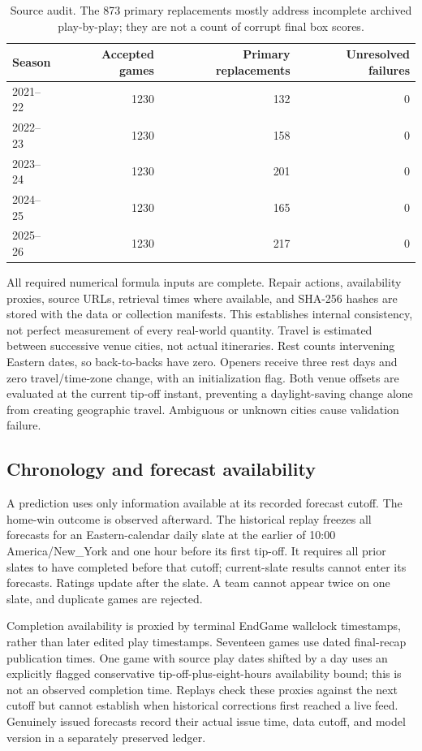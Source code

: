 \documentclass[11pt]{article}
\begin{document}
\begin{table}[ht]
\centering\small
\begin{tabular}{lrrr}
\toprule
Season & Accepted games & Primary replacements & Unresolved failures\\
\midrule
2021--22 & 1230 & 132 & 0\\
2022--23 & 1230 & 158 & 0\\
2023--24 & 1230 & 201 & 0\\
2024--25 & 1230 & 165 & 0\\
2025--26 & 1230 & 217 & 0\\
\bottomrule
\end{tabular}
\caption{Source audit. The 873 primary replacements mostly address incomplete
archived play-by-play; they are not a count of corrupt final box scores.}
\end{table}

All required numerical formula inputs are complete. Repair actions, availability
proxies, source URLs, retrieval times where available, and SHA-256 hashes are
stored with the data or collection manifests. This establishes internal
consistency, not perfect measurement of every real-world quantity. Travel is
estimated between successive venue cities, not actual itineraries. Rest counts
intervening Eastern dates, so back-to-backs have zero. Openers receive three
rest days and zero travel/time-zone change, with an initialization flag.
Both venue offsets are evaluated at the current tip-off instant, preventing
a daylight-saving change alone from creating geographic travel. Ambiguous
or unknown cities cause validation failure.

\subsection{Chronology and forecast availability}
A prediction uses only information available at its recorded forecast cutoff.
The home-win outcome is observed afterward.
The historical replay freezes all forecasts for an Eastern-calendar daily
slate at the earlier of 10:00 America/New\_York and one hour before its first
tip-off. It requires all prior slates to have completed before that cutoff;
current-slate results cannot enter its forecasts. Ratings update after the
slate. A team cannot appear twice on one slate, and duplicate games are rejected.

Completion availability is proxied by terminal EndGame wallclock timestamps,
rather than later edited play timestamps. Seventeen games use dated final-recap
publication times. One game with source play dates shifted by a day uses an
explicitly flagged conservative tip-off-plus-eight-hours availability bound;
this is not an observed completion time. Replays check these proxies against
the next cutoff but cannot establish when historical corrections first reached
a live feed. Genuinely issued forecasts record their actual issue time,
data cutoff, and model version in a separately preserved ledger.
\end{document}
